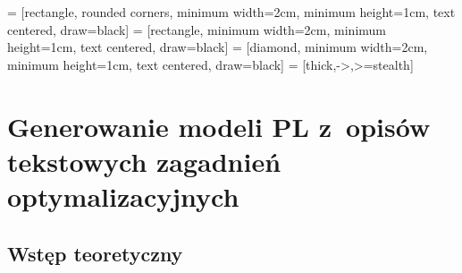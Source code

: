 \usetikzlibrary{shapes, arrows}
\usetikzlibrary{positioning}
\usetikzlibrary{shapes.geometric, arrows, positioning}
\usetikzlibrary{intersections, patterns, calc}

 = [rectangle, rounded corners, minimum width=2cm, minimum height=1cm, text centered, draw=black]
 = [rectangle, minimum width=2cm, minimum height=1cm, text centered, draw=black]
 = [diamond, minimum width=2cm, minimum height=1cm, text centered, draw=black]
 = [thick,->,>=stealth]

\chapter{Generowanie modeli PL z~opisów tekstowych zagadnień optymalizacyjnych}\label{ch:generation}

\section{Wstęp teoretyczny}





